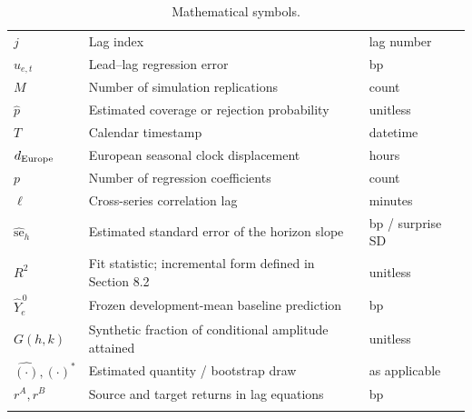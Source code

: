 {\begin{longtable}{@{}L{26mm}L{92mm}L{38.5mm}@{}}
$j$ & Lag index & lag number \\ \hline
$u_{e,t}$ & Lead–lag regression error & bp \\ \hline
$M$ & Number of simulation replications & count \\ \hline
$\hat p$ & Estimated coverage or rejection probability & unitless \\ \hline
$T$ & Calendar timestamp & datetime \\ \hline
$d_{\rm Europe}$ & European seasonal clock displacement & hours \\ \hline
$p$ & Number of regression coefficients & count \\ \hline
$\ell$ & Cross-series correlation lag & minutes \\ \hline
$\widehat{\mathrm{se}}_h$ & Estimated standard error of the horizon slope & bp / surprise SD \\ \hline
$R^2$ & Fit statistic; incremental form defined in Section 8.2 & unitless \\ \hline
$\widehat Y_e^{\,0}$ & Frozen development-mean baseline prediction & bp \\ \hline
$G(h,k)$ & Synthetic fraction of conditional amplitude attained & unitless \\ \hline
$\widehat{(\cdot)},(\cdot)^*$ & Estimated quantity / bootstrap draw & as applicable \\ \hline
$r^A, r^B$ & Source and target returns in lag equations & bp \\ \hline
{}\bottomrule
\caption[Mathematical symbols]{Mathematical symbols.}\label{tab:symbols}\\
\end{longtable}}
